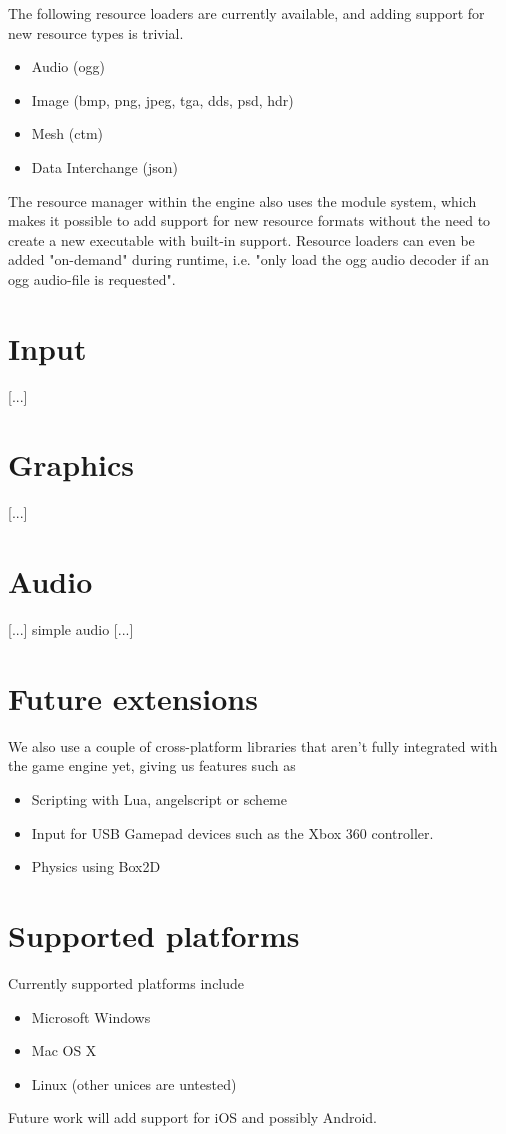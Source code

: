 The following resource loaders are currently available, and adding support for new resource types is trivial.
\begin{itemize}
\item Audio (ogg)
\item Image (bmp, png, jpeg, tga, dds, psd, hdr)
\item Mesh (ctm)
\item Data Interchange (json)
\end{itemize}

The resource manager within the engine also uses the module system, which makes it possible to add support for new resource formats without the need to create a new executable with built-in support. Resource loaders can even be added "on-demand" during runtime, i.e. "only load the ogg audio decoder if an ogg audio-file is requested".

\section{Input}
[...]

\section{Graphics}
[...]

\section{Audio}
[...] simple audio [...]

\section{Future extensions}

We also use a couple of cross-platform libraries that aren't fully integrated with the game engine yet, giving us features such as
\begin{itemize}
\item Scripting with Lua, angelscript or scheme
\item Input for USB Gamepad devices such as the Xbox 360 controller.
\item Physics using Box2D
\end{itemize}

\section{Supported platforms}
Currently supported platforms include
\begin{itemize}
\item Microsoft Windows
\item Mac OS X
\item Linux (other unices are untested)
\end{itemize}
Future work will add support for iOS and possibly Android.

